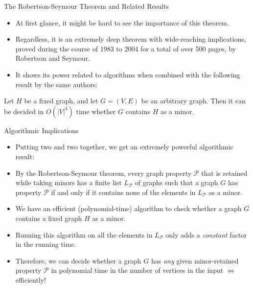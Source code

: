 \begin{frame}{The Robertson-Seymour Theorem and Related Results}
\begin{itemize}
  \item {
  At first glance, it might be hard to see the importance of this theorem.
  } \pause
  \item {
  Regardless, it is an extremely deep theorem with wide-reaching implications, proved during the course of 1983 to 2004 for a total of over 500 pages, by Robertson and Seymour.
  } \pause
  \item { 
  It shows its power related to algorithms when combined with the following result by the same authors:
  }
  \end{itemize}
  \pause
  \begin{theorem}
  Let $H$ be a fixed graph, and let $G = (V, E)$ be an arbitrary graph. Then it can be decided in $O(\lvert V\rvert^3)$ time whether $G$ contains $H$ as a minor.
  \end{theorem}
\end{frame}

\begin{frame}{Algorithmic Implications}
\begin{itemize}
  \item {
  Putting two and two together, we get an extremely powerful algorithmic result:
  } \pause
  \item {
    By the Robertson-Seymour theorem, every graph property $\mathcal{P}$ that is retained while taking minors has a finite list $L_\mathcal{P}$ of graphs such that a graph $G$ has property $\mathcal{P}$ if and only if it contains none of the elements in $L_\mathcal{P}$ as a minor.
  } \pause
  \item{
 We have an efficient (polynomial-time) algorithm to check whether a graph $G$ contains a fixed graph $H$ as a minor. 
  } \pause
    \item{
 Running this algorithm on all the elements in $L_{\mathcal{P}}$ only adds a \emph{constant} factor in the running time.
  } \pause
  \item{
  Therefore, we can decide whether a graph $G$ has \emph{any} given minor-retained property $\mathcal{P}$ in polynomial time in the number of vertices in the input $\Leftrightarrow$ efficiently!
  }
  \end{itemize}
\end{frame}

